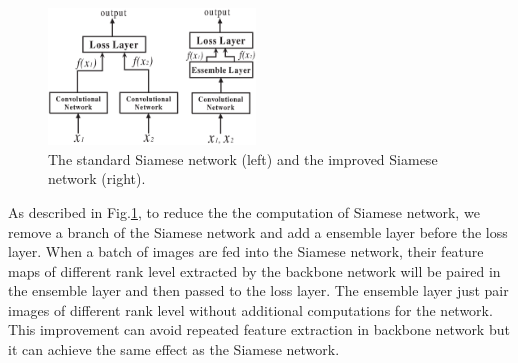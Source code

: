 \documentclass[english]{DDCLSconf}
\begin{document}
\begin{figure}[!htb]
	\centering
	
	\includegraphics[width=0.49\textwidth]{fig2.eps}
	
	
	\caption{The standard Siamese network (left) and the improved Siamese network (right).}
	
	\label{siamese}       %
	
\end{figure}		

As described in Fig.\ref{siamese}, to reduce the the computation of Siamese network, we remove a branch of the Siamese network and add a ensemble layer before the loss layer. When a batch of images are fed into the Siamese network, their feature maps of different rank level extracted by the backbone network will be paired in the ensemble layer and then passed to the loss layer. The ensemble layer just pair images of different rank level without additional computations for the network. This improvement can avoid repeated feature extraction in backbone network but it can achieve the same effect as the Siamese network.
\end{document}
